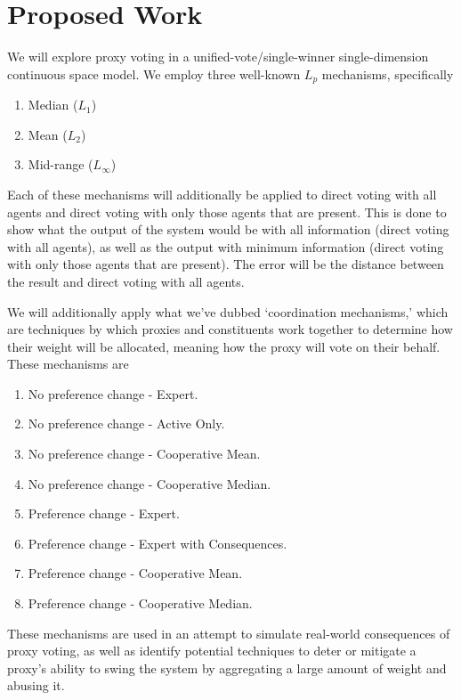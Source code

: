 \section{Proposed Work}\label{sec:\chptindicator-contribution}
We will explore proxy voting in a unified-vote/single-winner single-dimension
continuous space model.
We employ three well-known $L_p$ mechanisms, specifically
\begin{enumerate}
    \item {
        Median ($L_1$)
    }
    \item {
        Mean ($L_2$)
    }
    \item {
        Mid-range ($L_\infty$)
    }
\end{enumerate}
Each of these mechanisms will additionally be applied to direct voting with all
agents and direct voting with only those agents that are present.
This is done to show what the output of the system would be with all information
(direct voting with all agents), as well as the output with minimum information
(direct voting with only those agents that are present).
The error will be the distance between the result and direct voting with all agents.

We will additionally apply what we've dubbed `coordination mechanisms,' which are
techniques by which proxies and constituents work together to determine how their
weight will be allocated, meaning how the proxy will vote on their behalf.
These mechanisms are
\begin{enumerate}
    \item {
        {No preference change - Expert}.
    }
    \item {
        {No preference change - Active Only}.
    }
    \item {
        {No preference change - Cooperative Mean}.
    }
    \item {
        {No preference change - Cooperative Median}.
    }
    \item {
        {Preference change - Expert}.
    }
    \item {
        {Preference change - Expert with Consequences}.
    }
    \item {
        {Preference change - Cooperative Mean}.
    }
    \item {
        {Preference change - Cooperative Median}.
    }
\end{enumerate}
These mechanisms are used in an attempt to simulate real-world consequences of proxy
voting, as well as identify potential techniques to deter or mitigate a proxy's
ability to swing the system by aggregating a large amount of weight and abusing it.

